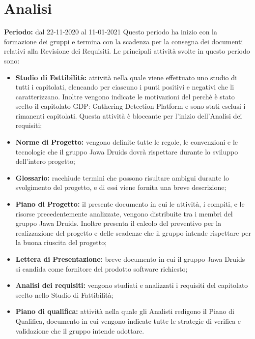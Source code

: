 \section{Analisi}\label{4.1}
\textbf{Periodo:} dal 22-11-2020 al 11-01-2021
Questo periodo ha inizio con la formazione dei gruppi e termina con la scadenza per la consegna dei documenti relativi alla Revisione dei Requisiti.
Le principali attività svolte in questo periodo sono:
\begin{itemize}
	\item \textbf{Studio di Fattibilità:} attività nella quale viene effettuato uno studio di tutti i capitolati, elencando per ciascuno i punti positivi e negativi che li caratterizzano. Inoltre vengono indicate le motivazioni del perchè è stato scelto il capitolato GDP: Gathering Detection Platform e sono stati esclusi i rimanenti capitolati.
	Questa attività è bloccante per l'inizio dell'Analisi dei requisiti;
	\item \textbf{Norme di Progetto:} vengono definite tutte le regole, le convenzioni e le tecnologie che il gruppo Jawa Druids dovrà rispettare durante lo sviluppo dell'intero progetto;
	\item \textbf{Glossario:} racchiude termini che possono risultare ambigui durante lo svolgimento del progetto, e di essi viene fornita una breve descrizione;
	\item \textbf{Piano di Progetto:} il presente documento in cui le attività, i compiti, e le risorse precedentemente analizzate, vengono distribuite tra i membri del gruppo Jawa Druids. Inoltre presenta il calcolo del preventivo per la realizzazione del progetto e delle scadenze che il gruppo intende rispettare per la buona riuscita del progetto;
	\item \textbf{Lettera di Presentazione:} breve documento in cui il gruppo Jawa Druids si candida come fornitore del prodotto software richiesto;
	\item \textbf{Analisi dei requisiti:} vengono studiati e analizzati i requisiti del capitolato scelto nello Studio di Fattibilità;
	\item \textbf{Piano di qualifica:} attività nella quale gli Analisti redigono il Piano di Qualifica, documento in cui vengono indicate tutte le strategie di verifica e validazione che il gruppo intende adottare.
\end{itemize}
